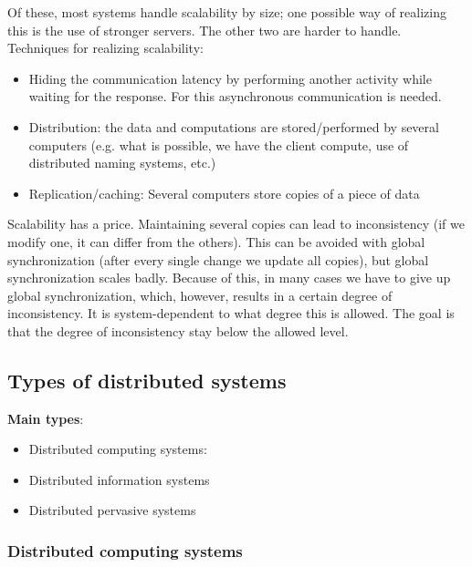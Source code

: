 \documentclass[margin=0px]{article}
\begin{document}
Of these, most systems handle scalability by size; one possible way of realizing this
is the use of stronger servers. The other two are harder to handle.\\

\noindent Techniques for realizing scalability:

\begin{itemize}
    \item	Hiding the communication latency by performing another activity while waiting for the response. For this
          asynchronous communication is needed.

    \item	Distribution: the data and computations are stored/performed by several computers (e.g. what is possible, we have the client compute,
          use of distributed naming systems, etc.)

    \item	Replication/caching: Several computers store copies of a piece of data
\end{itemize}

Scalability has a price. Maintaining several copies can lead to inconsistency (if we modify one, it can differ from the others).
This can be avoided with global synchronization (after every single change we update all copies), but global
synchronization scales badly. Because of this, in many cases we have to give up global synchronization, which, however, results in a certain
degree of inconsistency. It is system-dependent to what degree this is allowed. The goal is that the degree of inconsistency
stay below the allowed level.

\subsection{Types of distributed systems}

\noindent \textbf{Main types}:
\begin{itemize}
    \item	Distributed computing systems:
    \item	Distributed information systems
    \item 	Distributed pervasive systems
\end{itemize}

\subsubsection{Distributed computing systems}
\end{document}
